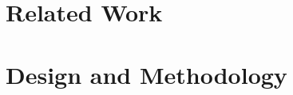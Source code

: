 \documentclass[runningheads]{llncs}
\begin{document}


















\section{Related Work}
\label{sec:Related Work}


\section{Design and Methodology}
\label{sec:Design and Methodology}









\end{document}

